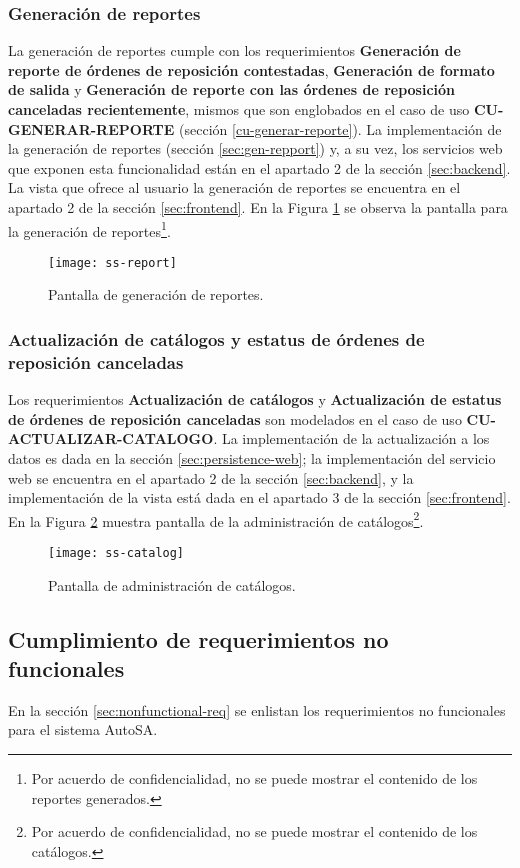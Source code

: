 \subsubsection{Generación de reportes}
La generación de reportes cumple con los requerimientos \textbf{Generación de reporte de órdenes de reposición contestadas}, \textbf{Generación de formato de salida} y \textbf{Generación de reporte con las órdenes de reposición canceladas recientemente}, mismos que son englobados en el caso de uso \textbf{CU-GENERAR-REPORTE} (sección \ref{cu-generar-reporte}). La implementación de la generación de reportes (sección \ref{sec:gen-repport}) y, a su vez, los servicios web que exponen esta funcionalidad están en el apartado 2 de la sección \ref{sec:backend}. La vista que ofrece al usuario la generación de reportes se encuentra en el apartado 2 de la sección \ref{sec:frontend}. En la Figura \ref{fig:ss-report} se observa la pantalla para la generación de reportes\footnote{Por acuerdo de confidencialidad, no se puede mostrar el contenido de los reportes generados.}. 
	\begin{figure}[h]
		\centering
		\texttt{[image: ss-report]}
		\caption{Pantalla de generación de reportes.}
		\label{fig:ss-report}
	\end{figure}

\subsubsection{Actualización de catálogos y estatus de órdenes de reposición canceladas}
Los requerimientos \textbf{Actualización de catálogos} y \textbf{Actualización de estatus de órdenes de reposición canceladas} son modelados en el caso de uso \textbf{CU-ACTUALIZAR-CATALOGO}. La implementación de la actualización a los datos es dada en la sección \ref{sec:persistence-web}; la implementación del servicio web se encuentra en el apartado 2 de la sección \ref{sec:backend}, y la implementación de la vista está dada en el apartado 3 de la sección \ref{sec:frontend}. En la Figura \ref{fig:ss-catalog} muestra pantalla de la administración de catálogos\footnote{Por acuerdo de confidencialidad, no se puede mostrar el contenido de los catálogos.}.
\begin{figure}[h]
	\centering
	\texttt{[image: ss-catalog]}
	\caption{Pantalla de administración de catálogos.}
	\label{fig:ss-catalog}
\end{figure}


\subsection{Cumplimiento de requerimientos no funcionales}
En la sección \ref{sec:nonfunctional-req} se enlistan los requerimientos no funcionales para el sistema AutoSA.

